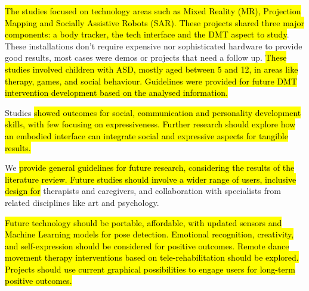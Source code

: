 \documentclass[a4paper,fleqn]{cas-sc}
\begin{document}
\hl{The studies focused on technology areas such as Mixed Reality (MR), Projection Mapping and Socially Assistive Robots (SAR). These projects shared three major components: a body tracker, the tech interface and the DMT aspect to study}. These installations don't require expensive nor sophisticated hardware to provide good results, most cases were demos or projects that need a follow up.\hl{
These studies involved children with ASD, mostly aged between 5 and 12, in areas like therapy, games, and social behaviour. Guidelines were provided for future DMT intervention development based on the analysed information.}

Studies \hl{showed outcomes for social, communication and personality development skills, with few focusing on expressiveness. %
Further research should explore how an embodied interface can integrate social and expressive aspects for tangible results.}

We \hl{provide general guidelines for future research, considering the results of the literature review. Future studies should involve a wider range of users, inclusive design for} therapists and caregivers, and collaboration with specialists from related disciplines like art and psychology.


\hl{Future technology should be portable, affordable, with updated sensors and Machine Learning models for pose detection. Emotional recognition, creativity, and self-expression should be considered for positive outcomes. Remote dance movement therapy interventions based on tele-rehabilitation should be explored. Projects should use current graphical possibilities to engage users for long-term positive outcomes.}
\end{document}

